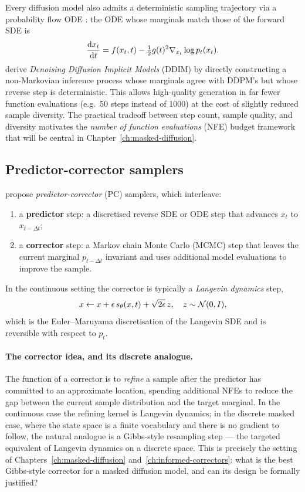 Every diffusion model also admits a deterministic sampling trajectory via a probability
flow ODE \parencite{song2021score}: the ODE whose marginals match those of the forward
SDE is
\begin{equation}
  \frac{\mathop{}\!\mathrm{d} x_t}{\mathop{}\!\mathrm{d} t}
  = f(x_t, t) - \tfrac{1}{2}g(t)^2 \nabla_{x_t}\log p_t(x_t).
  \label{eq:probability-flow-ode}
\end{equation}
\textcite{song2020ddim} derive \emph{Denoising Diffusion Implicit Models} (DDIM) by
directly constructing a non-Markovian inference process whose marginals agree with
DDPM's but whose reverse step is deterministic. This allows high-quality generation in
far fewer function evaluations (e.g.\ 50 steps instead of 1000) at the cost of slightly
reduced sample diversity. The practical tradeoff between step count, sample quality, and
diversity motivates the \emph{number of function evaluations} (NFE) budget framework
that will be central in Chapter~\ref{ch:masked-diffusion}.

\subsection{Predictor-corrector samplers}
\label{ssec:predictor-corrector}

\textcite{song2021score} propose \emph{predictor-corrector} (PC) samplers, which
interleave:
\begin{enumerate}[nosep]
  \item a \textbf{predictor} step: a discretised reverse SDE or ODE step that advances
        $x_t$ to $x_{t-\Delta t}$;
  \item a \textbf{corrector} step: a Markov chain Monte Carlo (MCMC) step that leaves
        the current marginal $p_{t-\Delta t}$ invariant and uses additional model
        evaluations to improve the sample.
\end{enumerate}
In the continuous setting the corrector is typically a \emph{Langevin dynamics} step,
\begin{equation}
  x \leftarrow x + \epsilon\,s_\theta(x, t) + \sqrt{2\epsilon}\,z,
  \quad z \sim \mathcal{N}(0,I),
  \label{eq:langevin}
\end{equation}
which is the Euler--Maruyama discretisation of the Langevin SDE and is reversible with
respect to $p_t$.

\paragraph{The corrector idea, and its discrete analogue.}
The function of a corrector is to \emph{refine} a sample after the predictor has
committed to an approximate location, spending additional NFEs to reduce the gap between
the current sample distribution and the target marginal. In the continuous case the
refining kernel is Langevin dynamics; in the discrete masked case, where the state space
is a finite vocabulary and there is no gradient to follow, the natural analogue is a
Gibbs-style resampling step --- the targeted equivalent of Langevin dynamics on a
discrete space. This is precisely the setting of Chapters~\ref{ch:masked-diffusion}
and~\ref{ch:informed-correctors}: what is the best Gibbs-style corrector for a masked
diffusion model, and can its design be formally justified?

